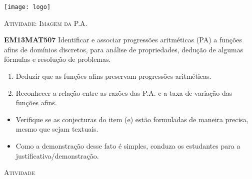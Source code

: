 \documentclass[10 pt,usenames,dvipsnames, oneside]{article}
\begin{document}
\begin{center}
  \begin{minipage}[l]{3cm}
\texttt{[image: logo]}    
\end{minipage}\hfill
\begin{minipage}[r]{.8\textwidth}
 {\Large \scshape Atividade: Imagem da P.A.}  
\end{minipage}
\end{center}
\vspace{.2cm}

\ifdefined\prof
\begin{objetivos}
\item \textbf{EM13MAT507} Identificar e associar progressões aritméticas (PA) a funções afins de domínios discretos, para análise de propriedades, dedução de algumas fórmulas e resolução de problemas.
\end{objetivos}

\begin{goals}
\begin{enumerate}
\item Deduzir que as funções afins preservam progressões aritméticas.
\item Reconhecer a relação entre as razões das P.A. e a taxa de variação das funções afins.
\end{enumerate}

\tcblower

\begin{itemize}
\item Verifique se as conjecturas do item (e) estão formuladas de maneira precisa, mesmo que sejam textuais.
\item Como a demonstração desse fato é simples, conduza os estudantes para a justificativa/demonstração.
\end{itemize}

\end{goals}

\bigskip
\begin{center}
{\large \scshape Atividade}
\end{center}
\fi
\end{document}
